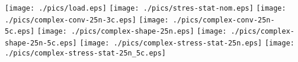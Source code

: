 \documentclass{article}
\begin{document}
\texttt{[image: ./pics/load.eps]}
\clearpage%
\texttt{[image: ./pics/stres-stat-nom.eps]}
\clearpage%
\texttt{[image: ./pics/complex-conv-25n-3c.eps]}
\clearpage%
\texttt{[image: ./pics/complex-conv-25n-5c.eps]}
\clearpage%
\texttt{[image: ./pics/complex-shape-25n.eps]}
\clearpage%
\texttt{[image: ./pics/complex-shape-25n-5c.eps]}
\clearpage%
\texttt{[image: ./pics/complex-stress-stat-25n.eps]}
\clearpage%
\texttt{[image: ./pics/complex-stress-stat-25n\_5c.eps]}
\clearpage%
\end{document}
